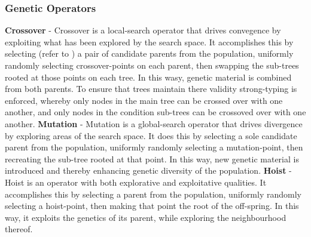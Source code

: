 \documentclass[a4paper,12pt]{article}
\begin{document}
        \subsubsection*{Genetic Operators}\label{subsubsec:geneticoperators}
            \par{
                \noindent \textbf{Crossover} - Crossover is a local-search operator that drives convegence by exploiting what has been explored by the search space. It accomplishes this 
                by selecting (refer to ) a pair of candidate parents from the population, uniformly randomly selecting crossover-points on each parent, then swapping the sub-trees rooted 
                at those points on each tree. In this wasy, genetic material is combined from both parents. To ensure that trees maintain there validity strong-typing is 
                enforced, whereby only nodes in the main tree can be crossed over with one another, and only nodes in the condition sub-trees can be crossoved over with
                one another.\newline 
                \newline 
                \textbf{Mutation} - Mutation is a global-search operator that drives divergence by exploring areas of the search space. It does this by selecting a sole candidate
                parent from the population, uniformly randomly selecting a mutation-point, then recreating the sub-tree rooted at that point. In this way, new genetic material is 
                introduced and thereby enhancing genetic diversity of the population.\newline 
                \newline 
                \textbf{Hoist} - Hoist is an operator with both explorative and exploitative qualities. It accomplishes this by selecting a parent from the population, 
                uniformly randomly selecting a hoist-point, then making that point the root of the off-spring. In this way, it exploits the genetics of its parent, while exploring 
                the neighbourhood thereof. 
            }
\end{document}
